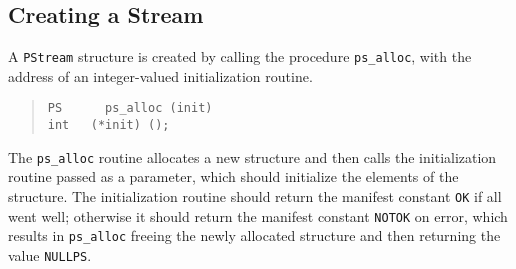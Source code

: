 \subsection	{Creating a Stream}
A \verb"PStream" structure is created by calling the procedure \verb"ps_alloc",
with the address of an integer-valued initialization routine.
\begin{quote}\small\begin{verbatim}
PS      ps_alloc (init)
int   (*init) ();
\end{verbatim}\end{quote}
The \verb"ps_alloc" routine allocates a new structure and then calls the
initialization routine passed as a parameter,
which should initialize the elements of the structure.
The initialization routine should return the manifest constant \verb"OK" if
all went well;
otherwise it should return the manifest constant \verb"NOTOK" on error,
which results in \verb"ps_alloc" freeing the newly allocated structure and
then returning the value \verb"NULLPS".

